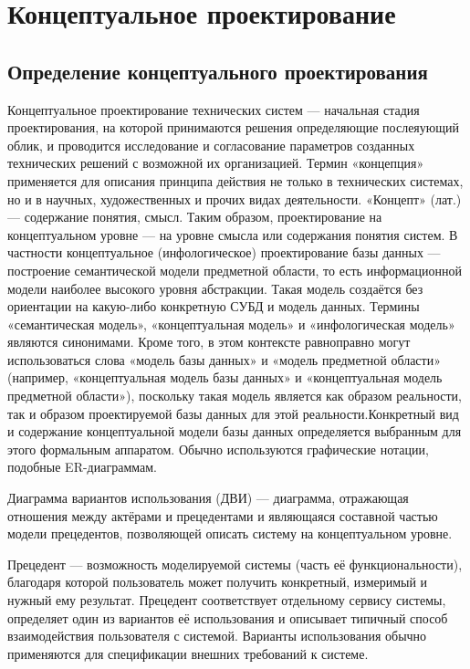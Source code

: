 \documentclass[14pt,a4paper,russian]{extreport}
\begin{document}
\chapter{Концептуальное проектирование}
\section{Определение концептуального проектирования}
Концептуальное проектирование технических систем — начальная стадия проектирования, на которой
принимаются решения определяющие послеяующий облик, и проводится исследование и согласование
параметров созданных технических решений с возможной их организацией. Термин «концепция»
применяется для описания принципа действия не только в технических системах, но и в научных,
художественных и прочих видах деятельности. «Концепт» (лат.) — содержание понятия, смысл. Таким
образом, проектирование на концептуальном уровне — на уровне смысла или содержания понятия систем.
В частности концептуальное (инфологическое) проектирование базы данных — построение семантической модели
предметной области, то есть информационной модели наиболее высокого уровня абстракции. Такая модель
создаётся без ориентации на какую-либо конкретную СУБД и модель данных. Термины «семантическая
модель», «концептуальная модель» и «инфологическая модель» являются синонимами. Кроме того,
в этом контексте равноправно могут использоваться слова «модель базы данных» и «модель
предметной области» (например, «концептуальная модель базы данных» и «концептуальная модель
предметной области»), поскольку такая модель является как образом реальности, так и
образом проектируемой базы данных для этой реальности.Конкретный вид и содержание концептуальной
модели базы данных определяется выбранным для этого формальным аппаратом. Обычно используются
графические нотации, подобные ER-диаграммам.
\par
Диаграмма вариантов использования (ДВИ) — диаграмма, отражающая
отношения между актёрами и прецедентами и являющаяся составной частью модели прецедентов,
позволяющей описать систему на концептуальном уровне.

Прецедент — возможность моделируемой системы (часть её функциональности), благодаря которой
пользователь может получить конкретный, измеримый и нужный ему результат. Прецедент соответствует
отдельному сервису системы, определяет один из вариантов её использования и описывает типичный
способ взаимодействия пользователя с системой. Варианты использования обычно применяются для
спецификации внешних требований к системе.  \cite{dbdesign}
\end{document}
